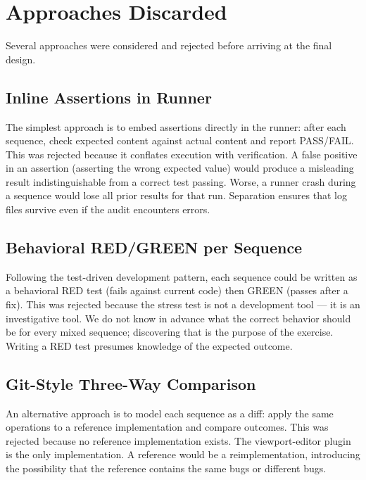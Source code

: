 \documentclass{article}
\begin{document}
\section{Approaches Discarded}
\label{sec:discarded}

Several approaches were considered and rejected before arriving at the final
design.

\subsection{Inline Assertions in Runner}
\label{sec:discarded-inline}

The simplest approach is to embed assertions directly in the runner: after each
sequence, check expected content against actual content and report PASS/FAIL.
This was rejected because it conflates execution with verification. A false
positive in an assertion (asserting the wrong expected value) would produce a
misleading result indistinguishable from a correct test passing. Worse, a
runner crash during a sequence would lose all prior results for that run.
Separation ensures that log files survive even if the audit encounters errors.

\subsection{Behavioral RED/GREEN per Sequence}
\label{sec:discarded-redgreen}

Following the test-driven development pattern, each sequence could be written
as a behavioral RED test (fails against current code) then GREEN (passes after
a fix). This was rejected because the stress test is not a development tool ---
it is an investigative tool. We do not know in advance what the correct
behavior should be for every mixed sequence; discovering that is the purpose
of the exercise. Writing a RED test presumes knowledge of the expected outcome.

\subsection{Git-Style Three-Way Comparison}
\label{sec:discarded-threeway}

An alternative approach is to model each sequence as a diff: apply the same
operations to a reference implementation and compare outcomes. This was rejected
because no reference implementation exists. The viewport-editor plugin is the
only implementation. A reference would be a reimplementation, introducing the
possibility that the reference contains the same bugs or different bugs.
\end{document}
